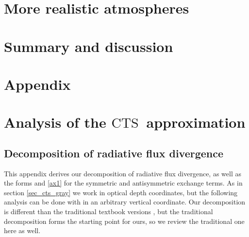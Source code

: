 \documentclass[10pt]{article}
\newcommand{\CTS}{\ensuremath{\mathrm{CTS}}}
\begin{document}
	
\section{More realistic atmospheres} \label{sec_real_atm}
 

\section{Summary and discussion}
\section*{Appendix}
\appendix

\section{Analysis of the \CTS\ approximation} \label{appendix_cts}



\subsection{Decomposition of radiative flux divergence} \label{appendix_cts_decomp}
This appendix derives our decomposition  of radiative flux divergence, as well as the forms  and \eqref{ax1} for the symmetric and antisymmetric exchange terms. As in section \ref{sec_cts_gray} we work in optical depth coordinates, but the following analysis can be done with in an arbitrary vertical coordinate. Our decomposition is different than the traditional textbook versions \citep[e.g.][]{petty2006,thomas2002}, but the traditional decomposition forms the starting point for ours, so we review the traditional one  here as well. 
\end{document}
